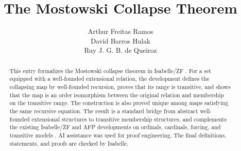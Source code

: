 \documentclass[11pt,a4paper]{article}
\begin{document}
\title{The Mostowski Collapse Theorem}
\author{Arthur Freitas Ramos\\
David Barros Hulak\\
Ruy J. G. B. de Queiroz}
\maketitle

\begin{abstract}
This entry formalizes the Mostowski collapse theorem in Isabelle/ZF
\cite{Mostowski1949,Mostowski1969}.  For a set equipped with a well-founded
extensional relation, the development defines the collapsing map by
well-founded recursion, proves that its range is transitive, and shows that the
map is an order isomorphism between the original relation and membership on the
transitive range.  The construction is also proved unique among maps satisfying
the same recursive equation.  The result is a standard bridge from abstract
well-founded extensional structures to transitive membership structures, and
complements the existing Isabelle/ZF and AFP developments on ordinals,
cardinals, forcing, and transitive models \cite{Kunen1980,Jech2003}.  AI
assistance was used for proof engineering.  The final definitions, statements,
and proofs are checked by Isabelle.
\end{abstract}

\tableofcontents





\end{document}

